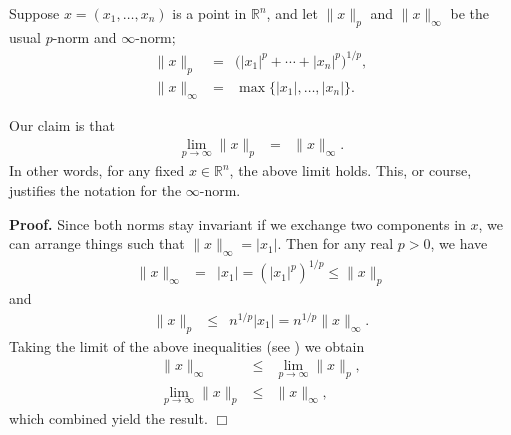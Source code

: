 \documentclass[12pt]{article}
\newcommand{\sR}[0]{\mathbb{R}}
\newcommand*{\norm}[1]{\lVert #1 \rVert}
\newcommand*{\abs}[1]{| #1 |}
\begin{document}
Suppose $x=(x_1,\ldots, x_n)$ is a point in $\sR^n$, and let $\norm{x}_p$
and $\norm{x}_\infty$ be the usual $p$-norm and $\infty$-norm;
\begin{eqnarray*}
\norm{x}_p &=& \big(|x_1|^p + \cdots + |x_n|^p\big)^{1/p},\\
\norm{x}_\infty &=& \max \{|x_1|, \ldots, |x_n|\}.
\end{eqnarray*}

Our claim is that
\begin{eqnarray}
\label{claim}
\lim_{p \to \infty} \norm{x}_p &=& \norm{x}_{\infty}.
\end{eqnarray}
In other words, for any fixed $x\in \sR^n$, the above limit holds.
This, or course,  justifies the notation for the $\infty$-norm.

{\bf Proof.}
Since both norms
stay invariant if we exchange two components in $x$, we can arrange things
such that $\norm{x}_\infty = |x_1|$. Then for any real $p>0$, we have
\begin{eqnarray*}
\norm{x}_\infty  &=&\abs{x_1} =(\abs{x_1}^p)^{1/p} \leq \norm{x}_p
\end{eqnarray*}
and
\begin{eqnarray*}
\norm{x}_p  &\le & n^{1/p} |x_1| =n^{1/p} \norm{x}_\infty.
\end{eqnarray*}
Taking the limit of the above inequalities (see 
)
we obtain
\begin{eqnarray*}
\norm{x}_\infty  &\le& \lim_{p\to \infty} \norm{x}_p,\\
\lim_{p\to \infty} \norm{x}_p  &\le & \norm{x}_\infty,
\end{eqnarray*}
which combined yield the result. $\Box$
\end{document}
